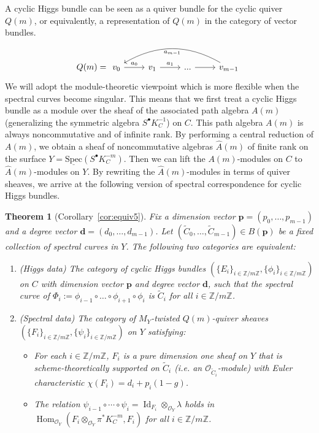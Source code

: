 \documentclass[11pt]{amsart}
\theoremstyle{plain}
\newtheorem{theorem}{Theorem}[section]
\theoremstyle{definition}
\theoremstyle{remark}
\def\O{\mathcal{O}}
\def\Spec{\textrm{Spec}}
\def\zm{\mathbb{Z}/m\mathbb{Z}}
\def\wAm{\widehat{A}(m)}
\def\tC{\widetilde{C}}
\begin{document}
A cyclic Higgs bundle can be seen as a quiver bundle for the cyclic quiver $Q(m)$, or equivalently, a representation of $Q(m)$ in the category of vector bundles.
\begin{equation*}
                        Q(m)= 
                    \begin{tikzcd}
              v_0\arrow[r,"a_0"]&v_1\arrow[r,"a_1"]&... \arrow[r]&v_{m-1}\arrow[lll,bend right,"a_{m-1}"]
                    \end{tikzcd}
            \end{equation*}
We will adopt the module-theoretic viewpoint which is more flexible when the spectral curves become singular. This means that we first treat a cyclic Higgs bundle as a module over the sheaf of the associated path algebra $A(m)$ (generalizing the symmetric algebra $S^\bullet K_C^{-1}$) on $C$. This path algebra $A(m)$ is always noncommutative and of infinite rank. By performing a central reduction of $A(m)$, we obtain a sheaf of noncommutative algebras $\wAm$ of finite rank on the surface $Y = \underline{\Spec}(S^\bullet K_C^{-m})$. Then we can lift the $A(m)$-modules on $C$ to $\wAm$-modules on $Y$. By rewriting the $\wAm$-modules in terms of quiver sheaves, we arrive at the following version of spectral correspondence for cyclic Higgs bundles. 
\begin{theorem}[Corollary~\ref{cor:equiv5}]\label{thm:main}
    Fix a dimension vector $\bm{p}=(p_0, \dots, p_{m-1})$ and a degree vector $\bm{d}=(d_0, \dots, d_{m-1})$.
Let $(\tC_0, \dots,\tC_{m-1})\in B(\bm{p})$ be a fixed collection of spectral curves in $Y$. The following two categories are equivalent:
\begin{enumerate}
    \item (Higgs data) The category of cyclic Higgs bundles $(\{E_i\}_{i\in \zm}, \{\phi_i\}_{i\in \zm})$ on $C$ with dimension vector $\bm{p}$ and degree vector $\bm{d}$, such that the spectral curve of  $\Phi_i:=\phi_{i-1} \circ \dots \circ \phi_{i+1} \circ \phi_i $ is $\tC_i$ for all $i\in \zm$.
    
    \item (Spectral data) The category of $M_Y$-twisted $Q(m)$-quiver sheaves $(\{F_i\}_{i\in\zm}, \{\psi_i\}_{i\in\zm})$ on $Y$ satisfying:
    \begin{itemize}
        \item[(a)] For each $i \in \mathbb{Z}/m\mathbb{Z}$, $F_i$ is a pure dimension one sheaf on $Y$ that is scheme-theoretically supported on $\tC_i$ (i.e. an $\O_{\tC_i}$-module) with Euler characteristic $\chi(F_i)= d_i + p_i(1-g)$. 
        \item[(b)] The relation $\psi_{i-1}\circ\cdots \circ \psi_{i} = \operatorname{Id}_{F_i}\otimes_{\O_Y} \lambda $ holds in $\operatorname{Hom}_{\O_Y}(F_i\otimes_{\O_Y} \pi^*K_C^{-m}, F_i )$ for all $i\in \mathbb{Z}/m\mathbb{Z}$. 
    \end{itemize}
\end{enumerate}
\end{theorem}
\end{document}
